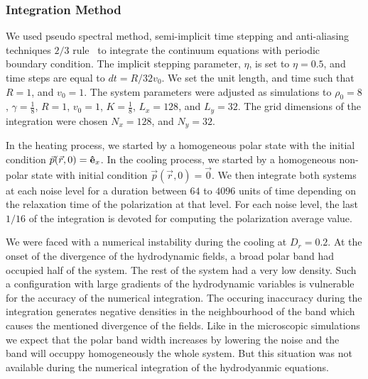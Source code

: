 \documentclass[reprint,floatfix,amsmath,amssymb,aps,pre,showkeys,showpacs,superscriptaddress]{revtex4-1}
\newcommand{\hl}[1]{\textcolor{hlcolor}{#1}}
\newcommand{\req}[1]{Eq.~(\ref{#1})}
\newcommand{\reqs}[2]{Eq.~(\ref{#1}), and~(\ref{#2})}
\begin{document}

\subsubsection{Integration Method}

We used pseudo spectral method, semi-implicit time stepping and anti-aliasing techniques $2/3$ rule~\cite{uecker2009short,canuto1993spectral} to integrate the continuum equations \hl{with periodic boundary condition}. The implicit stepping parameter, $\eta$, is set to $\eta=0.5$, and time steps are equal to \hl{$dt=R/32v_0$}. We set the unit length, and time such that $R=1$, and $v_0=1$. The system parameters were adjusted as simulations to $\rho_0=8$, $\gamma=\tfrac{1}{8}$, $R=1$, $v_0=1$, $K=\tfrac{1}{8}$, $L_x=128$, and $L_y=32$. The grid dimensions of the integration were chosen $N_x=128$, and $N_y=32$.

In the heating process, we started by a homogeneous polar state with the initial condition $\vec{p}(\vec{r},0) = {\bf \hat{e}}_x$. \hl{In the cooling process, we started by a homogeneous non-polar state with initial condition $\vec{p}(\vec{r},0) = \vec{0}$. We then integrate both systems at each noise level} for \hl{a} duration between \hl{$64$} to \hl{$4096$} units of time depending on \hl{the} relaxation time of the polarization at that level. For each noise level, the last $1/16$ of the integration is devoted for computing the polarization average value.

\hl{We were faced with a numerical instability during the cooling at $D_r=0.2$. At the onset of the divergence of the hydrodynamic fields, a broad polar band had occupied half of the system. The rest of the system had a very low density. Such a configuration with large gradients of the hydrodynamic variables is vulnerable for the accuracy of the numerical integration. The occuring inaccuracy during the integration generates negative densities in the neighbourhood of the band which causes the mentioned divergence of the fields. Like in the microscopic simulations we expect that the polar band width increases by lowering the noise and the band will occuppy homogeneously the whole system. But this situation was not available during the numerical integration of the hydrodyanmic equations.
}
\end{document}
